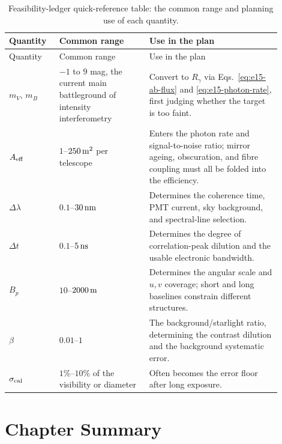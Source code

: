 \begin{longtable}{p{0.16\linewidth}p{0.30\linewidth}p{0.44\linewidth}}
\caption{Feasibility-ledger quick-reference table: the common range and planning use of each quantity.}
\label{tab:e15-checklist}\\
\toprule
Quantity & Common range & Use in the plan \\
\midrule
\endfirsthead
\toprule
Quantity & Common range & Use in the plan \\
\midrule
\endhead
$m_V,\,m_B$ & $-1$ to $9$ mag, the current main battleground of intensity interferometry & Convert to $R_\gamma$ via Eqs.~\eqref{eq:e15-ab-flux} and \eqref{eq:e15-photon-rate}, first judging whether the target is too faint. \\
$A_{\rm eff}$ & $1$--$250\,{\rm m^2}$ per telescope & Enters the photon rate and signal-to-noise ratio; mirror ageing, obscuration, and fibre coupling must all be folded into the efficiency. \\
$\Delta\lambda$ & $0.1$--$30\,{\rm nm}$ & Determines the coherence time, PMT current, sky background, and spectral-line selection. \\
$\Delta t$ & $0.1$--$5\,{\rm ns}$ & Determines the degree of correlation-peak dilution and the usable electronic bandwidth. \\
$B_p$ & $10$--$2000\,{\rm m}$ & Determines the angular scale and $u,v$ coverage; short and long baselines constrain different structures. \\
$\beta$ & $0.01$--$1$ & The background/starlight ratio, determining the contrast dilution and the background systematic error. \\
$\sigma_{\rm cal}$ & $1\%$--$10\%$ of the visibility or diameter & Often becomes the error floor after long exposure. \\
\bottomrule
\end{longtable}

\section{Chapter Summary}
\label{sec:e15-summary}

